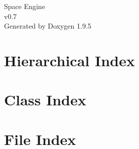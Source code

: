 \documentclass[twoside]{book}
\newcommand{\+}{\discretionary{\mbox{\scriptsize$\hookleftarrow$}}{}{}}
\newcommand{\clearemptydoublepage}{%
    \newpage{\pagestyle{empty}\cleardoublepage}%
  }
\begin{document}
  \raggedbottom
    \hypersetup{pageanchor=false,
                bookmarksnumbered=true,
                pdfencoding=unicode
               }
  \begin{titlepage}
  \vspace*{7cm}
  \begin{center}%
  {\Large Space Engine}\\
  [1ex]\large v0.\+7 \\
  \vspace*{1cm}
  {\large Generated by Doxygen 1.9.5}\\
  \end{center}
  \end{titlepage}
  \clearemptydoublepage
  \tableofcontents
  \clearemptydoublepage
  \hypersetup{pageanchor=true}
\chapter{Hierarchical Index}

\chapter{Class Index}

\chapter{File Index}

\end{document}
